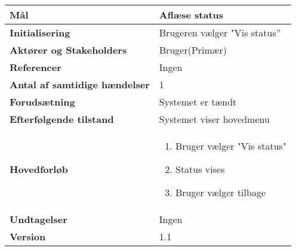 \begin{table}[H] \centering
\begin{tabular}{|p{6cm}|p{8cm}|}
	\hline
\textbf{Mål}	&
Aflæse status \\\hline
\textbf{Initialisering} &
Brugeren vælger "Vis status” \\\hline
\textbf{Aktører og Stakeholders} &
Bruger(Primær) \\\hline
\textbf{Referencer} &
Ingen \\\hline
\textbf{Antal af samtidige hændelser} &
1 \\\hline
\textbf{Forudsætning} &
Systemet er tændt \\\hline
\textbf{Efterfølgende tilstand} &
Systemet viser hovedmenu \\\hline
\textbf{Hovedforløb} &
\begin{enumerate}
\item Bruger vælger "Vis status"
\item Status vises
\item Bruger vælger tilbage
\end{enumerate} \\\hline
\textbf{Undtagelser} &
Ingen \\\hline
		\textbf{Version}		&1.1 \\\hline
	\end{tabular}
	\label{UC3} 
\end{table}